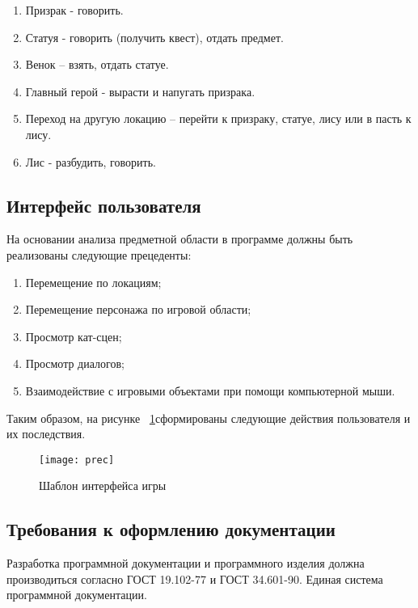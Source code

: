 \begin{enumerate}
	\item Призрак - говорить.
	\item Статуя - говорить (получить квест), отдать предмет.
	\item Венок – взять, отдать статуе.
	\item Главный герой - вырасти и напугать призрака.
	\item Переход на другую локацию – перейти к призраку, статуе, лису или в пасть к лису.
	\item Лис - разбудить, говорить.
\end{enumerate}

\subsection{Интерфейс пользователя}

На основании анализа предметной области в программе должны быть реализованы следующие прецеденты:
\begin{enumerate}
\item Перемещение по локациям;
\item Перемещение персонажа по игровой области;
\item Просмотр кат-сцен;
\item Просмотр диалогов;
\item Взаимодействие с игровыми объектами при помощи компьютерной мыши.
\end{enumerate}
Таким образом, на рисунке ~\ref{prec:image}сформированы следующие действия пользователя и их последствия.
\begin{figure}[ht]
	\texttt{[image: prec]}
	\caption{Шаблон интерфейса игры}
	\label{prec:image}
\end{figure}

\subsection{Требования к оформлению документации}

Разработка программной документации и программного изделия должна производиться согласно ГОСТ 19.102-77 и ГОСТ 34.601-90. Единая система программной документации.

